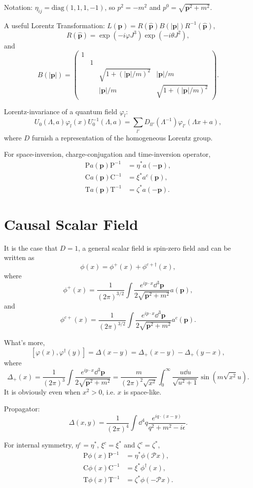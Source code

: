 \documentclass[8pt]{book}
\begin{document}
Notation: $\eta_{ij}=\mathrm{diag}(1,1,1,-1)$, so $p^2=-m^2$ and $p^0=\sqrt{\bm{p}^2+m^2}$.

A useful Lorentz Transformation: $L(\bm{p})=R(\hat{\bm{p}})B(|\bm{p}|)R^{-1}(\hat{\bm{p}})$, 
\[
	R(\hat{\bm{p}})=\exp(-i\varphi J^3)\exp(-i\theta J^2),
\]
and 
\[
	B(|\bm{p}|)=
	\begin{pmatrix}
		1&&&\\
		&1&&\\
		&&\sqrt{1+(|\bm{p}|/m)^2}&|\bm{p}|/m\\
		&&|\bm{p}|/m&\sqrt{1+(|\bm{p}|/m)^2}
	 \end{pmatrix}.
\]

Lorentz-invariance of a quantum field $\varphi_l$:
\[
	U_0(\Lambda,a)\varphi_l(x)U_0^{-1}(\Lambda,a)=\sum_{l'}D_{ll'}(\Lambda^{-1})\varphi_{l'}(\Lambda x+a),
\]
where $D$ furnish a representation of the homogeneous Lorentz group.

For space-inversion, charge-conjugation and time-inversion operator,
\begin{align*}
	\mathrm{P}a(\bm{p})\mathrm{P}^{-1}&=\eta^*a(-\bm{p}),\\
	\mathrm{C}a(\bm{p})\mathrm{C}^{-1}&=\xi^*a^c(\bm{p}),\\
	\mathrm{T}a(\bm{p})\mathrm{T}^{-1}&=\zeta^*a(-\bm{p}).
\end{align*}

\section{Causal Scalar Field}
It is the case that $D=1$, a general scalar field is spin-zero field and can be written as
\[
	\phi(x)=\phi^+(x)+\phi^{c+\dag}(x),
\]
where
\[
	\phi^+(x)=\frac{1}{(2\pi)^{3/2}}\int \frac{e^{ip\cdot x}\dd^3\bm{p}}{2\sqrt{\bm{p}^2+m^2}}a(\bm{p}),
\]
and
\[
	\phi^{c+}(x)=\frac{1}{(2\pi)^{3/2}}\int \frac{e^{ip\cdot x}\dd^3\bm{p}}{2\sqrt{\bm{p}^2+m^2}}a^c(\bm{p}).
\]

What's more,
\[
	[\varphi(x),\varphi^\dag(y)]=\Delta(x-y)=\Delta_+(x-y)-\Delta_+(y-x),
\]
where
\[
	\Delta_+(x)=\frac{1}{(2\pi)^3}\int  \frac{e^{ip\cdot x}\dd^3\bm{p}}{2\sqrt{\bm{p}^2+m^2}}=\frac{m}{(2\pi)^2\sqrt{x^2}}\int_0^\infty  \frac{u\dd u}{\sqrt{u^2+1}}\sin(m\sqrt{x^2}u).
\]
It is obviously even when $x^2>0$, i.e. $x$ is space-like.

Propagator:
\[
	\Delta(x,y)=\frac{1}{(2\pi)^4}\int \dd^4q \frac{e^{iq\cdot (x-y)}}{q^2+m^2-i\epsilon}.
\]

For internal symmetry, $\eta^c=\eta^*$, $\xi^c=\xi^*$ and $\zeta^c=\zeta^*$,
\[
\begin{split}
	\mathrm{P}\phi(x)\mathrm{P}^{-1}&=\eta^*\phi(\mathscr{P}x),\\
	\mathrm{C}\phi(x)\mathrm{C}^{-1}&=\xi^*\phi^{\dag}(x),\\
	\mathrm{T}\phi(x)\mathrm{T}^{-1}&=\zeta^*\phi(-\mathscr{P}x).
\end{split}
\]
\end{document}
